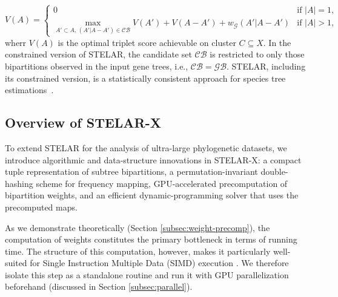 \documentclass[10pt,a4paper]{article}
\begin{document}
\begin{equation}
V(A) = 
\begin{cases} 
0 & \text{if } |A| = 1, \\[6pt]
\max_{A' \subset A, \, (A'|A-A') \in \mathcal{CB}}  V(A') + V(A - A') + w_{\mathcal{G}}(A'|A - A') & \text{if } |A| > 1,
\end{cases}
\label{eq:recurrence-relation}
\end{equation}
wherr $V(A)$ is the optimal triplet score achievable on cluster $C\subseteq X$.%
In the constrained version of STELAR, the candidate set $\mathcal{CB}$ is restricted to only those bipartitions observed in the input gene trees, i.e., %
$\mathcal{CB} = \mathcal{GB}$. STELAR, including its constrained version, is a statistically consistent approach for species tree estimations~\cite{stelar}.



\subsection{Overview of STELAR-X}

To extend STELAR for the analysis of ultra-large phylogenetic datasets, 
we introduce algorithmic and data-structure innovations in STELAR-X: a compact tuple representation of subtree bipartitions, a permutation-invariant double-hashing scheme for frequency mapping, GPU-accelerated precomputation of bipartition weights, and an efficient dynamic-programming solver that uses the precomputed maps.

As we demonstrate theoretically (Section \ref{subsec:weight-precomp}), the computation of weights constitutes the primary bottleneck in terms of running time. The structure of this computation, however, makes it particularly well-suited for Single Instruction Multiple Data (SIMD) execution \cite{Yi-SIMD-GPU-2024ASO}. We therefore isolate this step as a standalone routine and run it with GPU parallelization beforehand (discussed in Section \ref{subsec:parallel}). 
\end{document}
